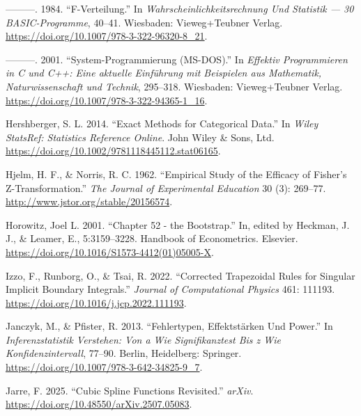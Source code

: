 \documentclass[
]{article}
\newlength{\cslhangindent}
\newlength{\cslentryspacingunit} %
\newenvironment{CSLReferences}[2] %
 {%
  \setlength{\parindent}{0pt}
  \ifodd #1
  \let\oldpar\par
  \def\par{\hangindent=\cslhangindent\oldpar}
  \fi
  \setlength{\parskip}{#2\cslentryspacingunit}
 }%
 {}
\begin{document}
\begin{CSLReferences}{1}{0}
\leavevmode{}%
---------. 1984. {``{F-Verteilung}.''} In
\emph{Wahrscheinlichkeitsrechnung Und Statistik --- 30 BASIC-Programme},
40--41. Wiesbaden: Vieweg+Teubner Verlag.
\url{https://doi.org/10.1007/978-3-322-96320-8_21}.

\leavevmode{}%
---------. 2001. {``System-Programmierung (MS-DOS).''} In
\emph{{Effektiv Programmieren in C und C++: Eine aktuelle Einführung mit
Beispielen aus Mathematik, Naturwissenschaft und Technik}}, 295--318.
Wiesbaden: Vieweg+Teubner Verlag.
\url{https://doi.org/10.1007/978-3-322-94365-1_16}.

\leavevmode{}%
Hershberger, S. L. 2014. {``Exact Methods for Categorical Data.''} In
\emph{Wiley StatsRef: Statistics Reference Online}. John Wiley \& Sons,
Ltd. \url{https://doi.org/10.1002/9781118445112.stat06165}.

\leavevmode{}%
Hjelm, H. F., \& Norris, R. C. 1962. {``{Empirical Study of the Efficacy
of Fisher's Z-Transformation}.''} \emph{The Journal of Experimental
Education} 30 (3): 269--77. \url{http://www.jstor.org/stable/20156574}.

\leavevmode{}%
Horowitz, Joel L. 2001. {``Chapter 52 - the Bootstrap.''} In, edited by
Heckman, J. J., \& Leamer, E., 5:3159--3228. Handbook of Econometrics.
Elsevier. \url{https://doi.org/10.1016/S1573-4412(01)05005-X}.

\leavevmode{}%
Izzo, F., Runborg, O., \& Tsai, R. 2022. {``Corrected Trapezoidal Rules
for Singular Implicit Boundary Integrals.''} \emph{Journal of
Computational Physics} 461: 111193.
\url{https://doi.org/10.1016/j.jcp.2022.111193}.

\leavevmode{}%
Janczyk, M., \& Pfister, R. 2013. {``Fehlertypen, Effektst{ä}rken Und
Power.''} In \emph{Inferenzstatistik Verstehen: Von a Wie
Signifikanztest Bis z Wie Konfidenzintervall}, 77--90. Berlin,
Heidelberg: Springer. \url{https://doi.org/10.1007/978-3-642-34825-9_7}.

\leavevmode{}%
Jarre, F. 2025. {``Cubic Spline Functions Revisited.''} \emph{arXiv}.
\url{https://doi.org/10.48550/arXiv.2507.05083}.


\end{CSLReferences}
\end{document}
